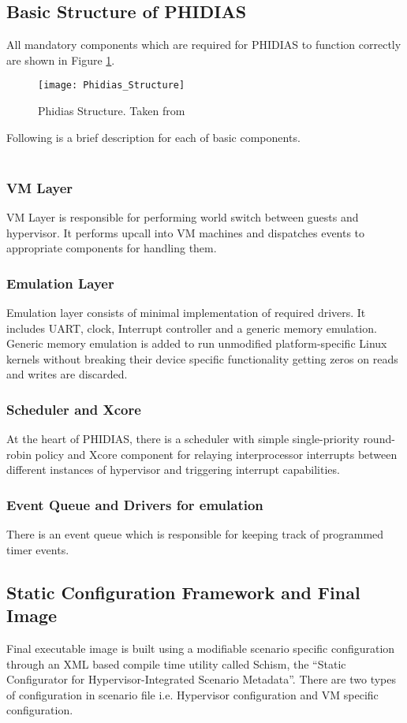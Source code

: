 \subsection{Basic Structure of PHIDIAS}
All mandatory components which are required for PHIDIAS to function correctly are shown in Figure \ref{Phidias_Structure}.

\begin{figure}[!htbp]
	\centering
	\texttt{[image: Phidias\_Structure]}
	\caption{Phidias Structure. Taken from \cite{Jan}}
	\label{Phidias_Structure}
\end{figure}

Following is a brief description for each of basic components.\\
\\
\subsubsection{VM Layer}
VM Layer is responsible for performing world switch between guests and hypervisor. It performs upcall into VM machines and dispatches events to appropriate components for handling them. 
\subsubsection{Emulation Layer}
Emulation layer consists of minimal implementation of required drivers. It includes UART, clock, Interrupt controller and a generic memory emulation. Generic memory emulation is added to run unmodified platform-specific Linux kernels without breaking their device specific functionality getting zeros on reads and writes are discarded.
\subsubsection{Scheduler and Xcore}
At the heart of PHIDIAS, there is a scheduler with simple single-priority round-robin policy and Xcore component for relaying interprocessor interrupts between different instances of hypervisor and triggering interrupt capabilities.
\subsubsection{Event Queue and Drivers for emulation}
There is an event queue which is responsible for keeping track of programmed timer events.

\subsection{Static Configuration Framework and Final Image}
Final executable image is built using a modifiable scenario specific configuration through an XML based compile time utility called Schism, the “Static Configurator for Hypervisor-Integrated Scenario Metadata”. There are two types of configuration in scenario file i.e. Hypervisor configuration and VM specific configuration.
